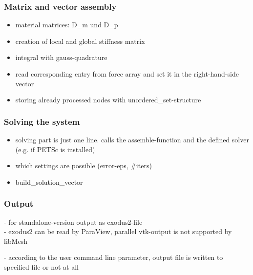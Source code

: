    
   
  \subsubsection{Matrix and vector assembly}
   \begin{itemize}
    \item material matrices: D\_m und D\_p
    
   	\item creation of local and global stiffness matrix
   	
   	\item integral with gauss-quadrature
   	
   	\item read corresponding entry from force array and set it in the right-hand-side vector

   	\item storing already processed nodes with unordered\_set-structure
   \end{itemize}
   
   
   
  \subsubsection{Solving the system}
   \begin{itemize}
   	\item solving part is just one line. calls the assemble-function and the defined solver (e.g. if PETSc is installed)
   	
    
    \item which settings are possible (error-eps, \#iters)
    
    \item build\_solution\_vector
   \end{itemize}
   
   
   
  \subsubsection{Output}
   - for standalone-version output as exodus2-file\\
   - exodus2 can be read by ParaView, parallel vtk-output is not supported by libMesh
   
   - according to the user command line parameter, output file is written to specified file or not at all
 
